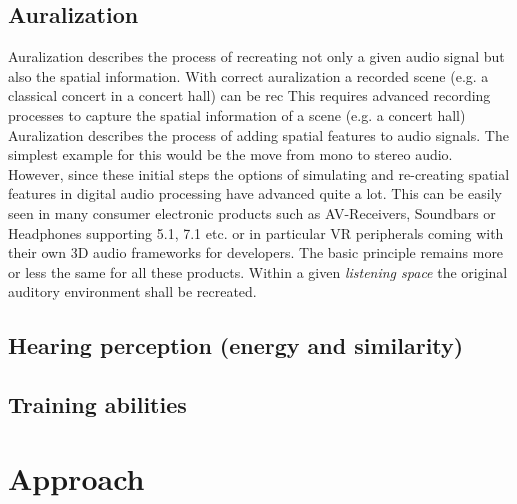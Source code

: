 \documentclass[a4paper,11pt]{article}%
\renewcommand{\\}{\vspace*{0.5\baselineskip} \newline}
\begin{document}
\subsection{Auralization}
\label{Sec:auralization}
Auralization describes the process of recreating not only a given audio signal but also the spatial information. With correct auralization a recorded scene (e.g. a classical concert in a concert hall) can be rec
\newline
This requires advanced recording processes to capture the spatial information of a scene (e.g. a concert hall)
\newline
Auralization describes the process of adding spatial features to audio signals. The simplest example for this would be the move from mono to stereo audio. However, since these initial steps the options of simulating and re-creating spatial features in digital audio processing have advanced quite a lot. This can be easily seen in many consumer electronic products such as AV-Receivers, Soundbars or Headphones supporting 5.1, 7.1  etc. or in particular \ac{VR} peripherals coming with their own 3D audio frameworks for developers.
\newline
\newline
The basic principle remains more or less the same for all these products. Within a given \textit{listening space} the original auditory environment shall be recreated.


\subsection{Hearing perception (energy and similarity)}



\subsection{Training abilities}




\section{Approach}
\label{sec:approach}
\end{document}
